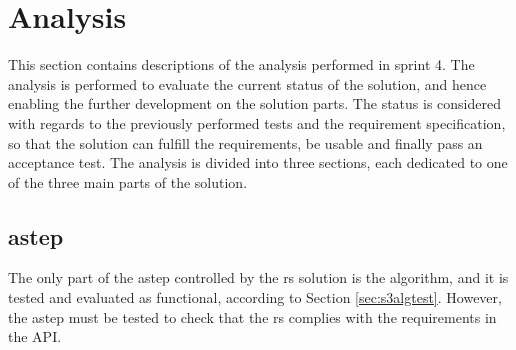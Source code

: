 \section{Analysis}
This section contains descriptions of the analysis performed in sprint 4.
The analysis is performed to evaluate the current status of the solution, and hence enabling the further development on the solution parts.
The status is considered with regards to the previously performed tests and the requirement specification, so that the solution can fulfill the requirements, be usable and finally pass an acceptance test.
The analysis is divided into three sections, each dedicated to one of the three main parts of the solution.

\iffalse
\subsection{Missing features for completing the solution}
The \gls{rs} solution has currently, successfully implemented the following parts:
\begin{itemize}
	\item \gls{rs} App
	\subitem Background location gathering and caching
	\subitem \gls{astep} Login
	\subitem Push routes to \gls{astep}
	\item \gls{astep}
	\subitem Algorithm matches routes
	\subitem Automatically determine regular routes
	\subitem Matching routes where one is a subroute
	\item \gls{rs} Server
	\subitem Database to store supplementary user data
\end{itemize} 

However, there are still parts to implement according to the requirements.
The missing features seen in the 'must have' category are:
\begin{itemize}
	\item Display matches to user
	\item User registration
\end{itemize}
\fi


\subsection{\gls{astep}}
The only part of the \gls{astep} controlled by the \gls{rs} solution is the algorithm, and it is tested and evaluated as functional, according to Section \ref{sec:s3algtest}. However, the \gls{astep} must be tested to check that the \gls{rs} complies with the requirements in the API.

